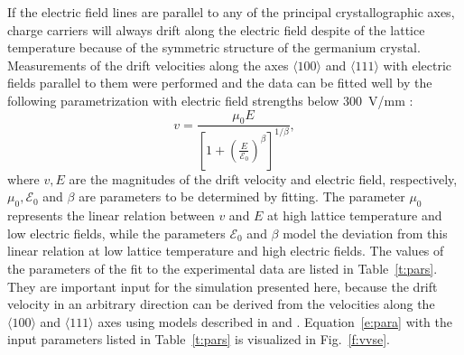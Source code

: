 \documentclass[epj]{svjour}
\begin{document}
If the electric field lines are parallel to any of the principal
crystallographic axes, charge carriers will always drift along the
electric field despite of the lattice temperature because of the
symmetric structure of the germanium crystal. Measurements of the
drift velocities along the axes $\langle 100 \rangle$ and $\langle 111
\rangle$ with electric fields parallel to them were performed
\cite{miha,reg} and the data can be fitted well by the following
parametrization \cite{Kno99} with electric field strengths below
300~V/mm \cite{miha}:
\begin{equation} 
\label{e:para} 
v = \frac{\mu_{0}E}{[1+(\frac{E}{\mathcal{E}_{0}})^{\beta}]^{1/\beta}}, 
\end{equation} 
where $v,E$ are the magnitudes of the drift velocity and electric
field, respectively, $\mu_{0},\mathcal{E}_{0}$ and $\beta$ are
parameters to be determined by fitting. The parameter $\mu_{0}$
represents the linear relation between $v$ and $E$ at high lattice
temperature and low electric fields, while the parameters
$\mathcal{E}_{0}$ and $\beta$ model the deviation from this linear
relation at low lattice temperature and high electric fields. The
values of the parameters of the fit to the experimental data are
listed in Table~\ref{t:pars}. They are important input for the
simulation presented here, because the drift velocity in an arbitrary
direction can be derived from the velocities along the $\langle 100
\rangle$ and $\langle 111 \rangle$ axes using models described in
\cite{miha} and \cite{bart}. Equation~\ref{e:para} with the input
parameters listed in Table~\ref{t:pars} is visualized in
Fig.~\ref{f:vvse}.
 
\end{document}

